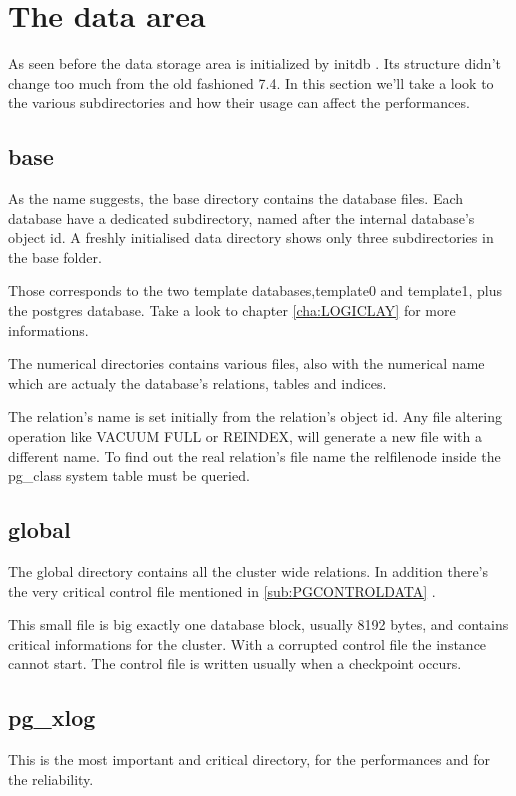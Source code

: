 \section{The data area}
\label{sec:PGDATA}
As seen before the data storage area is initialized by initdb .
Its structure didn't change too much from the old fashioned 7.4.
In this section we'll take a look to the various subdirectories and how their 
usage can affect the performances. 


\subsection{base}
\label{sub:BASE}
As the name suggests, the base directory contains the database files. Each 
database have a dedicated subdirectory, named after the internal database's 
object id.
A freshly initialised data directory shows only three 
subdirectories in the base folder.

Those corresponds to the two template databases,template0 and template1, plus 
the postgres database. Take a look to chapter \ref{cha:LOGICLAY} for more 
informations.

The numerical directories contains various files, also with the numerical name 
which are actualy the database's relations, tables and indices. 

The relation's name is set initially from the relation's object id. Any file 
altering operation like VACUUM FULL or REINDEX, will generate a new file 
with a different name. To find out the real relation's file name the 
relfilenode inside the pg\_class system table  must be queried.

\subsection{global}
The global directory contains all the cluster wide relations.
In addition there's the very critical  control file mentioned in 
\ref{sub:PGCONTROLDATA} .

This small file is big exactly one database block, usually 8192 bytes, and 
contains critical informations for the cluster. 
With a corrupted control file the instance cannot start. 
The control file is written usually when a checkpoint occurs.

\subsection{pg\_xlog}
This is the most important and critical directory, for the performances and for 
the reliability. 

